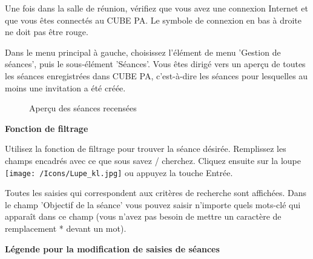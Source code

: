 Une fois dans la salle de réunion, vérifiez que vous avez une connexion Internet et que vous êtes connectés au CUBE PA. Le symbole de connexion en bas à droite ne doit pas être rouge.

\vspace{\baselineskip}

Dans le menu principal à gauche, choisissez l'élément de menu 'Gestion de séances', puis le sous-élément 'Séances'. Vous êtes dirigé vers un aperçu de toutes les séances enregistrées dans CUBE PA, c'est-à-dire les séances pour lesquelles au moins une invitation a été créée. 

\begin{figure}[H]
\caption{Aperçu des séances recensées}
\end{figure}

\textbf{Fonction de filtrage}

Utilisez la fonction de filtrage pour trouver la séance désirée. Remplissez les champs encadrés avec ce que sous savez / cherchez. Cliquez ensuite sur la loupe \texttt{[image: /Icons/Lupe\_kl.jpg]} ou appuyez la touche Entrée.

\vspace{\baselineskip}

Toutes les saisies qui correspondent aux critères de recherche sont affichées. Dans le champ 'Objectif de la séance' vous pouvez saisir n'importe quels mots-clé qui apparaît dans ce champ (vous n'avez pas besoin de mettre un caractère de remplacement * devant un mot).

\vspace{\baselineskip}

\textbf{Légende pour la modification de saisies de séances}

\vspace{\baselineskip}

